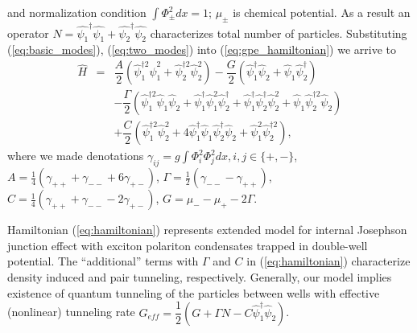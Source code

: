 \documentclass[aps, pre, preprint, groupedaddress, superscriptaddress, showkeys, showpacs] {revtex4-1}
\begin{document}
{%
%
and normalization condition $\int \Phi_{\pm}^2 dx = 1$; $\mu_{\pm}$ is chemical potential.
As a result an operator $N=\hat{\psi_1}^\dag\hat{\psi_1} + \hat{\psi_2}^\dag\hat{\psi_2}$ characterizes total number of particles.
Substituting (\ref{eq:basic_modes}), (\ref{eq:two_modes}) into (\ref{eq:gpe_hamiltonian}) we arrive to
% 
\begin{equation}
\begin{array}{lcl}
\hat{H} & = & \dfrac{A}{2} (\hat{\psi}_1^{\dag 2} \hat{\psi}_1^2 + \hat{\psi}_2^{\dag 2} \hat{\psi}_2^2) - \dfrac{G}{2} (\hat{\psi}_1^\dag \hat{\psi}_2 + \hat{\psi}_1 \hat{\psi}_2^\dag) \\ [8pt]
& & -\dfrac{\Gamma}{2} (\hat{\psi}_1^{\dag 2} \hat{\psi}_1 \hat{\psi}_2 + \hat{\psi}_1^\dag \hat{\psi}_1^2 \hat{\psi}_2^\dag + \hat{\psi}_1^\dag \hat{\psi}_2^\dag \hat{\psi}_2^2 + \hat{\psi}_1 \hat{\psi}_2^{\dag 2} \hat{\psi}_2) \\ [8pt]
& & +\dfrac{C}{2} (\hat{\psi}_1^{\dag 2} \hat{\psi}_2^2 + 4 \hat{\psi}_1^\dag \hat{\psi}_1 \hat{\psi}_2^\dag \hat{\psi}_2 + \hat{\psi}_1^2 \hat{\psi}_2^{\dag 2}),
\end{array}
\label{eq:hamiltonian}
\end{equation}
%
where we made denotations $\gamma_{ij} = g \int \Phi_i^2 \Phi_j^2 dx, i,j \in \{+,-\}$,
$A = \frac{1}{4} (\gamma_{++} + \gamma_{--} + 6 \gamma_{+-})$, $\Gamma = \frac{1}{2} (\gamma_{--} - \gamma_{++})$, $C = \frac{1}{4} (\gamma_{++} + \gamma_{--} - 2\gamma_{+-})$, $G = \mu_- - \mu_+ - 2\Gamma$.

Hamiltonian (\ref{eq:hamiltonian}) represents extended model for internal Josephson junction effect with exciton polariton condensates trapped in double-well potential.
The ``additional'' terms with $\Gamma$ and $C$ in (\ref{eq:hamiltonian}) characterize density induced and pair tunneling, respectively.
Generally, our model implies existence of quantum tunneling of the particles between wells with effective (nonlinear) tunneling rate $G_{eff} = \dfrac{1}{2}(G+\Gamma N - C\hat{\psi}_1^\dag\hat{\psi}_2)$.

}
\end{document}
